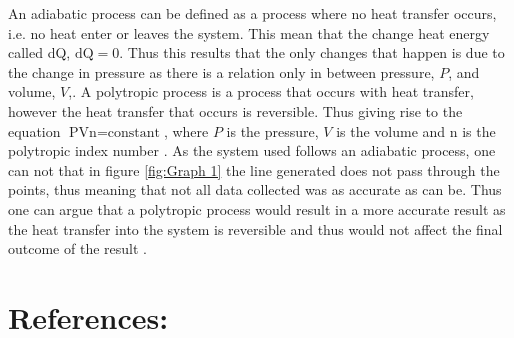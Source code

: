 \documentclass[12pt, a4paper]{article}
\begin{document}
\medskip
\noindent
An adiabatic process can be defined as a process where no heat transfer occurs, i.e. no heat enter or leaves the system. This mean that the change heat energy called dQ, $\text{dQ}=0$. Thus this results that the only changes that happen is due to the change in pressure as there is a relation only in between pressure, $P$, and volume, $V$,\parencite{mashkevich}. A polytropic process is a process that occurs with heat transfer, however the heat transfer that occurs is reversible. Thus giving rise to the equation $\text{PVn}=\text{constant}$, where $P$ is the pressure, $V$ is the volume and n is the polytropic index number \parencite{muncaster}. As the system used follows an adiabatic process, one can not that in figure \ref{fig:Graph 1} the line generated does not pass through the points, thus meaning that not all data collected was as accurate as can be. Thus one can argue that a polytropic process would result in a more accurate result as the heat transfer into the system is reversible and thus would not affect the final outcome of the result \parencite{gresh}.

\section*{References:}
\printbibliography[heading=none]
\end{document}
